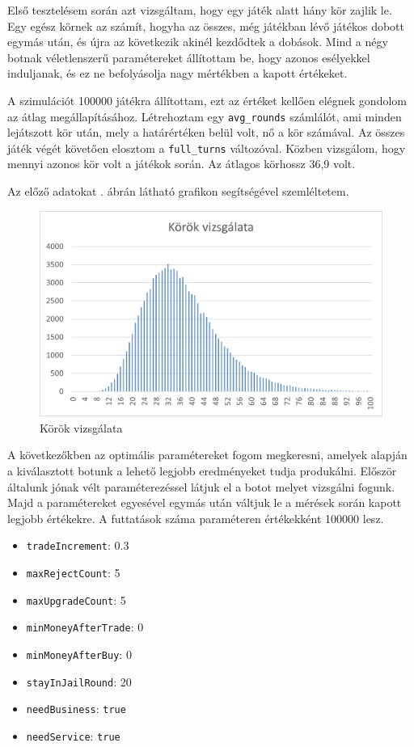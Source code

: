 
Első tesztelésem során azt vizsgáltam, hogy egy játék alatt hány kör zajlik le. Egy egész körnek az számít, hogyha az összes, még játékban lévő játékos dobott egymás után, és újra az következik akinél kezdődtek a dobások. Mind a négy botnak véletlenszerű paramétereket állítottam be, hogy azonos esélyekkel induljanak, és ez ne befolyásolja nagy mértékben a kapott értékeket.

A szimulációt 100000 játékra állítottam, ezt az értéket kellően elégnek gondolom az átlag megállapításához. Létrehoztam egy \texttt{avg\_rounds} számlálót, ami minden lejátszott kör után, mely a határértéken belül volt, nő a kör számával. Az összes játék végét követően elosztom a \texttt{full\_turns} változóval. Közben vizsgálom, hogy mennyi azonos kör volt a játékok során. Az átlagos körhossz 36,9 volt.

Az előző adatokat . ábrán látható grafikon segítségével szemléltetem.

\begin{figure}[h!]
\centering
\includegraphics[scale=0.2]{images/Kep1.png}
\caption{Körök vizsgálata}
\label{fig:korok}
\end{figure}


A következőkben az optimális paramétereket fogom megkeresni, amelyek alapján a kiválasztott botunk a lehető legjobb eredményeket tudja produkálni. Először általunk jónak vélt paraméterezéssel látjuk el a botot melyet vizsgálni fogunk. Majd a paramétereket egyesével egymás után váltjuk le a mérések során kapott legjobb értékekre. A futtatások száma paraméteren értékekként 100000 lesz.

\begin{itemize}
	\item \texttt{tradeIncrement}: 0.3
	\item \texttt{maxRejectCount}: 5
	\item \texttt{maxUpgradeCount}: 5
	\item \texttt{minMoneyAfterTrade}: 0
	\item \texttt{minMoneyAfterBuy}: 0
	\item \texttt{stayInJailRound}: 20
	\item \texttt{needBusiness}: \texttt{true}
	\item \texttt{needService}: \texttt{true}
\end{itemize}

